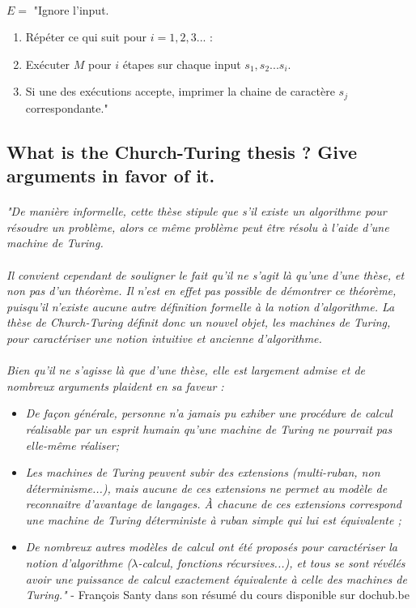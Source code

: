\paragraph{}
$E = $ "Ignore l'input.
\begin{enumerate}
\item Répéter ce qui suit pour $i = 1, 2, 3...$ :
\item Exécuter $M$ pour $i$ étapes sur chaque input $s_{1}, s_{2}...s_{i}$.
\item Si une des exécutions accepte, imprimer la chaine de caractère $s_{j}$ correspondante."
\end{enumerate}

\subsection{What is the Church-Turing thesis ? Give arguments in favor of it.}
\paragraph{}
\textit{"De manière informelle, cette thèse stipule que s’il existe un algorithme pour résoudre un problème, alors ce même problème peut être résolu à l’aide d’une machine de Turing.} 
\paragraph{}
\textit{Il convient cependant de souligner le fait qu’il ne s’agit là qu’une d’une thèse, et non pas d’un théorème. Il n’est en effet pas possible de démontrer ce théorème, puisqu’il n’existe aucune autre définition formelle à la notion d’algorithme. La thèse de Church-Turing définit donc un nouvel objet, les machines de Turing, pour caractériser une notion intuitive et ancienne
d’algorithme.}

\paragraph{}
\textit{Bien qu’il ne s’agisse là que d’une thèse, elle est largement admise et de nombreux arguments plaident en sa faveur :}
\begin{itemize}
\item \textit{De façon générale, personne n'a jamais pu exhiber une procédure de calcul réalisable par un esprit humain qu'une machine de Turing ne pourrait pas elle-même réaliser;}

\item \textit{Les machines de Turing peuvent subir des extensions (multi-ruban, non déterminisme...), mais aucune de ces extensions ne permet au modèle de reconnaitre d’avantage de langages. À chacune de ces extensions correspond une machine de Turing déterministe à ruban simple qui lui est équivalente ;}

\item \textit{De nombreux autres modèles de calcul ont été proposés pour caractériser la notion d’algorithme ($\lambda$-calcul, fonctions récursives...), et tous se sont révélés avoir une puissance de calcul exactement équivalente à celle des machines de Turing."} - François Santy dans son résumé du cours disponible sur dochub.be
\end{itemize}

